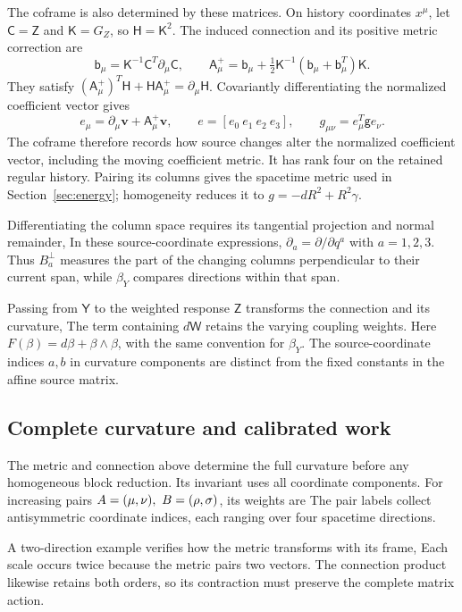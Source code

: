 The coframe is also determined by these matrices. On history coordinates $x^\mu$, let $\mathsf C=\mathsf Z$ and $\mathsf K=G_Z$, so $\mathsf H=\mathsf K^2$. The induced connection and its positive metric correction are
\[
\mathsf b_\mu=\mathsf K^{-1}\mathsf C^T\partial_\mu\mathsf C,\qquad
\mathsf A^+_\mu=\mathsf b_\mu+
\tfrac12\mathsf K^{-1}(\mathsf b_\mu+\mathsf b_\mu^T)\mathsf K.
\]
They satisfy $(\mathsf A^+_\mu)^T\mathsf H+\mathsf H\mathsf A^+_\mu=\partial_\mu\mathsf H$. Covariantly differentiating the normalized coefficient vector gives
\[
e_\mu=\partial_\mu\mathbf v+\mathsf A^+_\mu\mathbf v,\qquad
e=[e_0\ e_1\ e_2\ e_3],\qquad
g_{\mu\nu}=e_\mu^T\mathsf g e_\nu.
\]
The coframe therefore records how source changes alter the normalized coefficient vector, including the moving coefficient metric. It has rank four on the retained regular history. Pairing its columns gives the spacetime metric used in Section~\ref{sec:energy}; homogeneity reduces it to $g=-dR^2+R^2\gamma$.

Differentiating the column space requires its tangential projection and normal remainder,
\SourceInducedConnectionDisplay
In these source-coordinate expressions, $\partial_a=\partial/\partial q^a$ with $a=1,2,3$. Thus $B_a^\perp$ measures the part of the changing columns perpendicular to their current span, while $\beta_Y$ compares directions within that span.

Passing from $\mathsf Y$ to the weighted response $\mathsf Z$ transforms the connection and its curvature,
\SourceConnectionTransformDisplay
The term containing $d\mathsf W$ retains the varying coupling weights. Here $F(\beta)=d\beta+\beta\wedge\beta$, with the same convention for $\beta_Y$. The source-coordinate indices $a,b$ in curvature components are distinct from the fixed constants in the affine source matrix.

\subsection{Complete curvature and calibrated work}
\label{app:curvature-work}
The metric and connection above determine the full curvature before any homogeneous block reduction. Its invariant uses all coordinate components. For increasing pairs $A=(\mu,\nu),\ B=(\rho,\sigma)$, its weights are
\NativeEnergyDefinitionDisplay
The pair labels collect antisymmetric coordinate indices, each ranging over four spacetime directions.

A two-direction example verifies how the metric transforms with its frame,
\EnergyMetricExampleDisplay
Each scale occurs twice because the metric pairs two vectors. The connection product likewise retains both orders,
\EnergyCurvatureOrderDisplay
so its contraction must preserve the complete matrix action.

